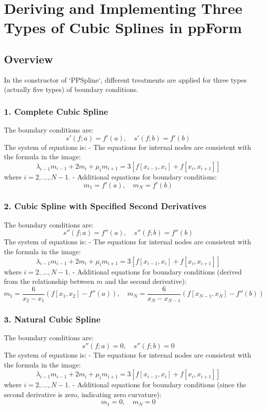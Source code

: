 \documentclass[a4paper]{article}
\begin{document}
\section{Deriving and Implementing Three Types of Cubic Splines in ppForm}

\subsection{Overview}

In the constructor of `PPSpline`, different treatments are applied for three types (actually five types) of boundary conditions.

\subsubsection{1. Complete Cubic Spline}
The boundary conditions are:
\[
s'(f; a) = f'(a), \quad s'(f; b) = f'(b)
\]
The system of equations is:
- The equations for internal nodes are consistent with the formula in the image:
  \[
  \lambda_{i-1} m_{i-1} + 2m_i + \mu_i m_{i+1} = 3[f[x_{i-1}, x_i] + f[x_i, x_{i+1}]]
  \]
  where \(i = 2, \dots, N-1\).
- Additional equations for boundary conditions:
  \[
  m_1 = f'(a), \quad m_N = f'(b)
  \]

\subsubsection{2. Cubic Spline with Specified Second Derivatives}
The boundary conditions are:
\[
s''(f; a) = f''(a), \quad s''(f; b) = f''(b)
\]
The system of equations is:
- The equations for internal nodes are consistent with the formula in the image:
  \[
  \lambda_{i-1} m_{i-1} + 2m_i + \mu_i m_{i+1} = 3[f[x_{i-1}, x_i] + f[x_i, x_{i+1}]]
  \]
  where \(i = 2, \dots, N-1\).
- Additional equations for boundary conditions (derived from the relationship between \(m\) and the second derivative):
  \[
  m_1 = \frac{6}{x_2 - x_1}(f[x_1, x_2] - f''(a)), \quad m_N = \frac{6}{x_N - x_{N-1}}(f[x_{N-1}, x_N] - f''(b))
  \]

\subsubsection{3. Natural Cubic Spline}
The boundary conditions are:
\[
s''(f; a) = 0, \quad s''(f; b) = 0
\]
The system of equations is:
- The equations for internal nodes are consistent with the formula in the image:
  \[
  \lambda_{i-1} m_{i-1} + 2m_i + \mu_i m_{i+1} = 3[f[x_{i-1}, x_i] + f[x_i, x_{i+1}]]
  \]
  where \(i = 2, \dots, N-1\).
- Additional equations for boundary conditions (since the second derivative is zero, indicating zero curvature):
  \[
  m_1 = 0, \quad m_N = 0
  \]
\end{document}
